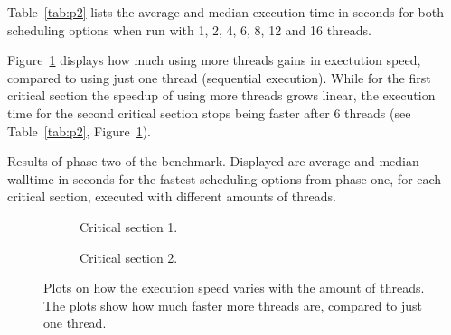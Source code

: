 \documentclass[twoside,11pt]{article}
\begin{document}
Table~\ref{tab:p2} lists the average and median execution
time in seconds for both scheduling options when run
with 1, 2, 4, 6, 8, 12 and 16 threads.

Figure~\ref{fig:speedup} displays how much using more
threads gains in exectution speed, compared to using just
one thread (sequential execution).
While for the first critical section the speedup of using
more threads grows linear, the execution time for the
second critical section stops being faster after 6
threads (see Table~\ref{tab:p2}, Figure~\ref{fig:speedup}).

\begin{table}
\begin{center}

\caption{Results of phase two of the benchmark. Displayed
  are average and median walltime in seconds for the
  fastest scheduling options from phase one, for each
  critical section, executed with different amounts of
  threads.}
\label{tab:p2}
\end{center}
\end{table}

\begin{figure}
\begin{subfigure}{\textwidth}
\begin{center}
\caption{Critical section 1.}
\end{center}
\vspace{0.5cm}
\end{subfigure}

\begin{subfigure}{\textwidth}
\begin{center}
\caption{Critical section 2.}
\end{center}
\vspace{0.5cm}
\end{subfigure}
\caption{Plots on how the execution speed varies with the
  amount of threads. The plots show how much faster more
  threads are, compared to just one thread.}
\label{fig:speedup}
\end{figure}
\end{document}
